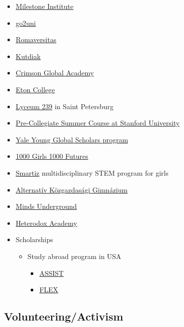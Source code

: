 \documentclass{article}
\begin{document}
\begin{itemize}
    \item \href{https://milestone-institute.org/}{Milestone Institute}
    \item \href{https://www.euroexam.org/go2uni}{go2uni}
    \item \href{https://romaversitas.hu/en/}{Romaversitas}
    \item \href{https://www.kutdiak.hu/en/}{Kutdiak}
    \item \href{https://www.crimsonglobalacademy.school/uk/}{Crimson Global Academy}
    \item \href{https://www.etoncollege.com/}{Eton College}
    \item \href{https://www.239.ru/}{Lyceum 239} in Saint Petersburg
    \item \href{https://summerinstitutes.spcs.stanford.edu/}{Pre-Collegiate Summer Course at Stanford University}
    \item \href{https://globalscholars.yale.edu/}{Yale Young Global Scholars program}
    \item \href{https://www.nyas.org/programs/global-stem-alliance/1000-girls-1000-futures/}{1000 Girls 1000 Futures}
    \item \href{https://nokatud.hu/smartiz/}{Smartiz} multidisciplinary STEM program for girls
    \item \href{https://www.akg.hu/}{Alternatív Közgazdasági Gimnázium}
    \item \href{https://www.mindsunderground.com/}{Minds Underground}
    \item \href{https://heterodoxacademy.org/}{Heterodox Academy}
    
    \item Scholarships
    \begin{itemize}
        \item Study abroad program in USA
        \begin{itemize}
            \item \href{https://www.assistscholars.org/en/index}{ASSIST}
            \item \href{https://www.discoverflex.org/}{FLEX}
        \end{itemize}
    \end{itemize}
\end{itemize}

\subsection{Volunteering/Activism}
\end{document}
